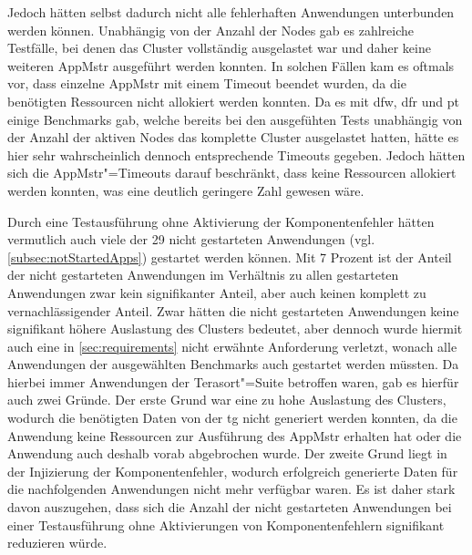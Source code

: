 Jedoch hätten selbst dadurch \uU nicht alle fehlerhaften Anwendungen unterbunden werden können.
Unabhängig von der Anzahl der Nodes gab es zahlreiche Testfälle, bei denen das Cluster vollständig ausgelastet war und daher keine weiteren \gls{AppMstr} ausgeführt werden konnten.
In solchen Fällen kam es oftmals vor, dass einzelne \gls{AppMstr} mit einem Timeout beendet wurden, da die benötigten Ressourcen nicht allokiert werden konnten.
Da es mit \acrlong{dfw}, \acrlong{dfr} und \acrlong{pt} einige Benchmarks gab, welche bereits bei den ausgefühten Tests unabhängig von der Anzahl der aktiven Nodes das komplette Cluster ausgelastet hatten, hätte es hier sehr wahrscheinlich dennoch entsprechende Timeouts gegeben.
Jedoch hätten sich die \gls{AppMstr}"=Timeouts darauf beschränkt, dass keine Ressourcen allokiert werden konnten, was eine deutlich geringere Zahl gewesen wäre.

Durch eine Testausführung ohne Aktivierung der Komponentenfehler hätten vermutlich auch viele der 29 nicht gestarteten Anwendungen (vgl. \cref{subsec:notStartedApps}) gestartet werden können.
Mit 7 Prozent ist der Anteil der nicht gestarteten Anwendungen im Verhältnis zu allen gestarteten Anwendungen zwar kein signifikanter Anteil, aber auch keinen komplett zu vernachlässigender Anteil.
Zwar hätten die nicht gestarteten Anwendungen keine signifikant höhere Auslastung des Clusters bedeutet, aber dennoch wurde hiermit auch eine in \cref{sec:requirements} nicht erwähnte Anforderung verletzt, wonach alle Anwendungen der ausgewählten Benchmarks auch gestartet werden müssten.
Da hierbei immer Anwendungen der Terasort"=Suite betroffen waren, gab es hierfür auch zwei Gründe.
Der erste Grund war eine zu hohe Auslastung des Clusters, wodurch die benötigten Daten von der \acrlong{tg} nicht generiert werden konnten, da die Anwendung keine Ressourcen zur Ausführung des \gls{AppMstr} erhalten hat oder die Anwendung auch deshalb vorab abgebrochen wurde.
Der zweite Grund liegt in der Injizierung der Komponentenfehler, wodurch erfolgreich generierte Daten für die nachfolgenden Anwendungen nicht mehr verfügbar waren.
Es ist daher stark davon auszugehen, dass sich die Anzahl der nicht gestarteten Anwendungen bei einer Testausführung ohne Aktivierungen von Komponentenfehlern signifikant reduzieren würde.

